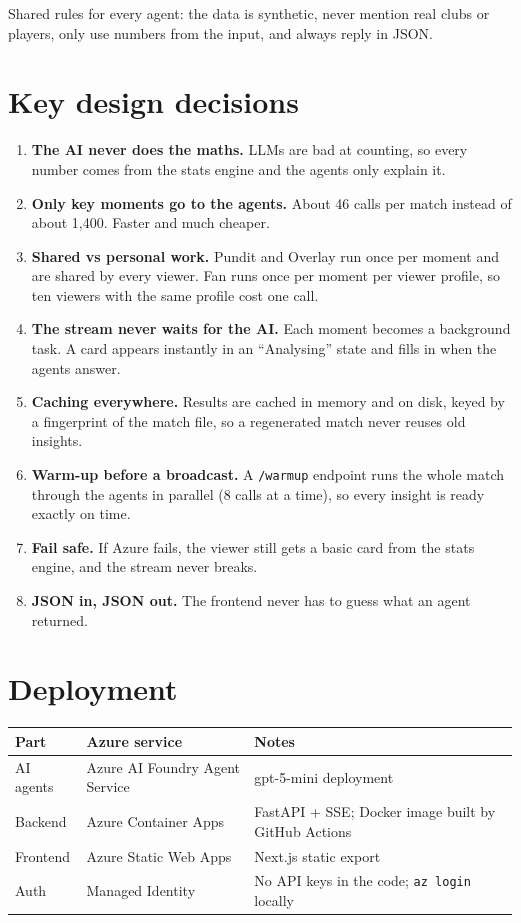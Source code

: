 \documentclass[11pt,a4paper]{article}
\newcommand{\code}[1]{\texttt{#1}}
\begin{document}
Shared rules for every agent: the data is synthetic, never mention real clubs or players, only use numbers from the input, and always reply in JSON.

\section{Key design decisions}

\begin{enumerate}
  \item \textbf{The AI never does the maths.} LLMs are bad at counting, so every number comes from the stats engine and the agents only explain it.
  \item \textbf{Only key moments go to the agents.} About 46 calls per match instead of about 1,400. Faster and much cheaper.
  \item \textbf{Shared vs personal work.} Pundit and Overlay run once per moment and are shared by every viewer. Fan runs once per moment per viewer profile, so ten viewers with the same profile cost one call.
  \item \textbf{The stream never waits for the AI.} Each moment becomes a background task. A card appears instantly in an ``Analysing'' state and fills in when the agents answer.
  \item \textbf{Caching everywhere.} Results are cached in memory and on disk, keyed by a fingerprint of the match file, so a regenerated match never reuses old insights.
  \item \textbf{Warm-up before a broadcast.} A \code{/warmup} endpoint runs the whole match through the agents in parallel (8 calls at a time), so every insight is ready exactly on time.
  \item \textbf{Fail safe.} If Azure fails, the viewer still gets a basic card from the stats engine, and the stream never breaks.
  \item \textbf{JSON in, JSON out.} The frontend never has to guess what an agent returned.
\end{enumerate}

\section{Deployment}

\begin{tabularx}{\textwidth}{@{}llX@{}}
\toprule
\textbf{Part} & \textbf{Azure service} & \textbf{Notes} \\
\midrule
AI agents & Azure AI Foundry Agent Service & gpt-5-mini deployment \\
Backend   & Azure Container Apps           & FastAPI + SSE; Docker image built by GitHub Actions \\
Frontend  & Azure Static Web Apps          & Next.js static export \\
Auth      & Managed Identity               & No API keys in the code; \code{az login} locally \\
\bottomrule
\end{tabularx}
\end{document}
